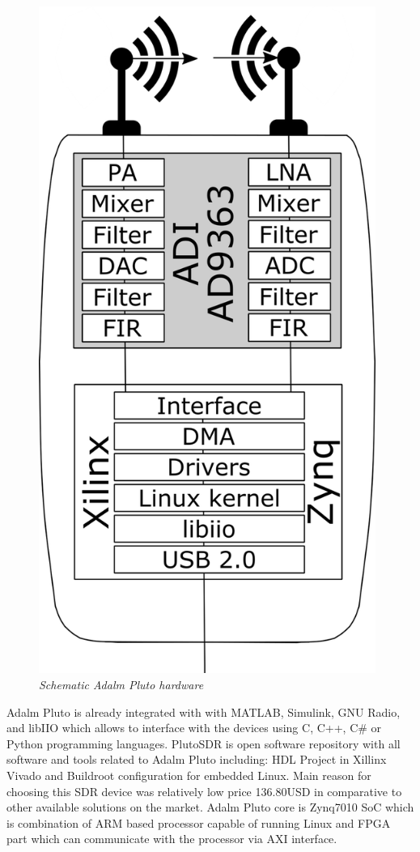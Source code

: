 \documentclass[en,printmode]{mgr}
\begin{document}
			\begin{figure}[!htb]
    			\centering
   				\includegraphics[width=11cm]{images/pluto_schematic.png}
   		 		\caption{\textit{Schematic Adalm Pluto hardware}}
			\end{figure}
			
			Adalm Pluto is already integrated with with MATLAB, Simulink, GNU Radio, and libIIO which
			allows to interface with the devices using C, C++, C\# or Python programming languages.
			PlutoSDR is open software repository with all software and tools related to Adalm Pluto
			including: HDL Project in Xillinx Vivado and Buildroot configuration for embedded Linux.
			Main reason for choosing this SDR device was relatively low price 136.80USD 
			in comparative to other
			available solutions on the market. Adalm Pluto core is 			
			Zynq7010 SoC which is combination of ARM based processor capable of running Linux and
			FPGA part which can communicate with the processor via AXI interface.
\end{document}
